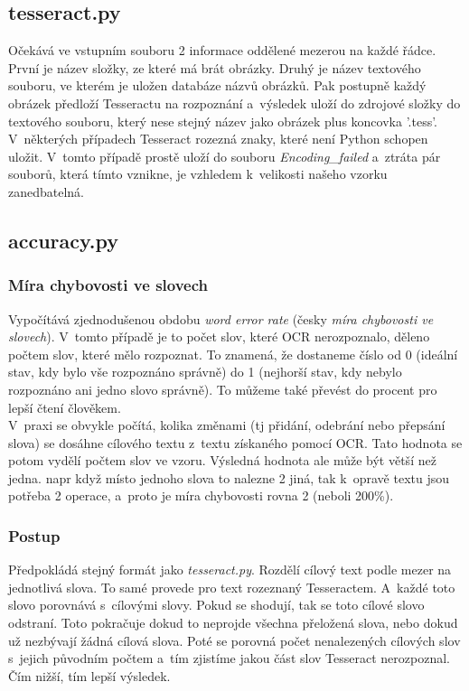 \documentclass[12pt,oneside]{report}			%
\begin{document}
	\subsection{tesseract.py}
	Očekává ve vstupním souboru 2 informace oddělené mezerou na každé řádce. První je název složky, ze které má brát obrázky. Druhý je název textového souboru, ve kterém je uložen databáze názvů obrázků. Pak postupně každý obrázek předloží Tesseractu na rozpoznání a~výsledek uloží do zdrojové složky do textového souboru, který nese stejný název jako obrázek plus koncovka '.tess'.\\
	V~některých případech Tesseract rozezná znaky, které není Python schopen uložit. V~tomto případě prostě uloží do souboru \textit{Encoding\_failed} a~ztráta pár souborů, která tímto vznikne, je vzhledem k~velikosti našeho vzorku zanedbatelná.
	\subsection{accuracy.py}
	\subsubsection{Míra chybovosti ve slovech}
	Vypočítává zjednodušenou obdobu \emph{word error rate} (česky \emph{míra chybovosti ve slovech}). V~tomto případě je to počet slov, které \gls{OCR} nerozpoznalo, děleno počtem slov, které mělo rozpoznat. To znamená, že dostaneme číslo od 0 (ideální stav, kdy bylo vše rozpoznáno správně) do 1 (nejhorší stav, kdy nebylo rozpoznáno ani jedno slovo správně). To můžeme také převést do procent pro lepší čtení člověkem.\\
	V~praxi se obvykle počítá, kolika změnami (\gls{tj} přidání, odebrání nebo přepsání slova) se dosáhne cílového textu z~textu získaného pomocí \gls{OCR}. Tato hodnota se potom vydělí počtem slov ve vzoru.  Výsledná hodnota ale může být větší než jedna. \Gls{napr} když místo jednoho slova to nalezne 2 jiná, tak k~opravě textu jsou potřeba 2 operace, a~proto je míra chybovosti rovna 2 (neboli 200\%). \parencite{wiki_wer}\\
	\subsubsection{Postup}
	 Předpokládá stejný formát jako \emph{tesseract.py}. Rozdělí cílový text podle mezer na jednotlivá slova. To samé provede pro text rozeznaný Tesseractem. A~každé toto slovo porovnává s~cílovými slovy. Pokud se shodují, tak se toto cílové slovo odstraní. Toto pokračuje dokud to neprojde všechna přeložená slova, nebo dokud už nezbývají žádná cílová slova. Poté se porovná počet nenalezených cílových slov s~jejich původním počtem a~tím zjistíme jakou část slov Tesseract nerozpoznal. Čím nižší, tím lepší výsledek.\\
\end{document}
